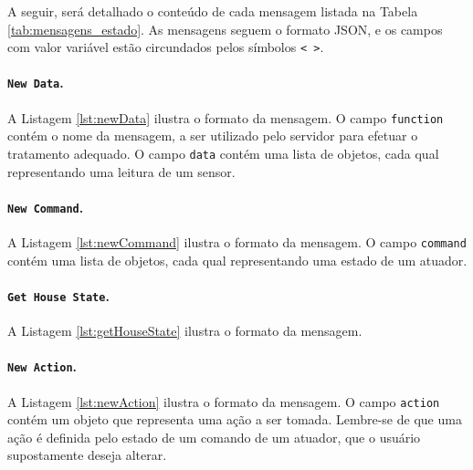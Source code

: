 A seguir, será detalhado o conteúdo de cada mensagem listada na Tabela \ref{tab:mensagens_estado}. As mensagens seguem o formato JSON, e os campos com valor variável estão circundados pelos símbolos \texttt{< >}.

\paragraph*{\texttt{New Data}.} A Listagem \ref{lst:newData} ilustra o formato da mensagem. O campo \texttt{function} contém o nome da mensagem, a ser utilizado pelo servidor para efetuar o tratamento adequado. O campo \texttt{data} contém uma lista de objetos, cada qual representando uma leitura de um sensor.

\noindent
\begin{minipage}[l]{\linewidth}

\end{minipage}

\paragraph*{\texttt{New Command}.} A Listagem \ref{lst:newCommand} ilustra o formato da mensagem. O campo \texttt{command} contém uma lista de objetos, cada qual representando uma estado de um atuador.

\noindent
\begin{minipage}[l]{\linewidth}

\end{minipage}

\paragraph*{\texttt{Get House State}.} A Listagem \ref{lst:getHouseState} ilustra o formato da mensagem.

\noindent
\begin{minipage}[l]{\linewidth}

\end{minipage}

\paragraph*{\texttt{New Action}.} A Listagem \ref{lst:newAction} ilustra o formato da mensagem. O campo \texttt{action} contém um objeto que representa uma ação a ser tomada. Lembre-se de que uma ação é definida pelo estado de um comando de um atuador, que o usuário supostamente deseja alterar.

